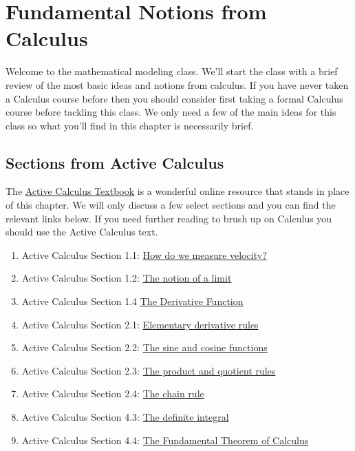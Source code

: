 \chapter{Fundamental Notions from Calculus}
Welcome to the mathematical modeling class.  We'll start the class with a brief review of
the most basic ideas and notions from calculus.  If you have never taken a Calculus course
before then you should consider first taking a formal Calculus course before tackling this
class.  We only need a few of the main ideas for this class so what you'll find in this
chapter is necessarily brief.

\section{Sections from Active Calculus}
The \href{http://faculty.gvsu.edu/boelkinm/Home/AC/index.html}{Active Calculus Textbook}
is a wonderful online resource that stands in place of this chapter.  We will only discuss a
few select sections and you can find the relevant links below.  If you need further
reading to brush up on Calculus you should use the Active Calculus text.  
\begin{enumerate}
    \item Active Calculus Section 1.1: \href{http://faculty.gvsu.edu/boelkinm/Home/AC/sec-1-1-vel.html}{How do we
        measure velocity?}
    \item Active Calculus Section 1.2: \href{http://faculty.gvsu.edu/boelkinm/Home/AC/sec-1-2-lim.html}{The notion of a
        limit}
    \item Active Calculus Section 1.4
        \href{http://faculty.gvsu.edu/boelkinm/Home/AC/sec-1-4-derivative-fxn.html}{The
        Derivative Function}
    \item Active Calculus Section 2.1: 
        \href{http://faculty.gvsu.edu/boelkinm/Home/AC/sec-2-1-elem-rules.html}{Elementary
        derivative rules}
    \item Active Calculus Section 2.2: \href{http://faculty.gvsu.edu/boelkinm/Home/AC/sec-2-2-sin-cos.html}{The sine and cosine functions}
    \item Active Calculus Section 2.3: \href{http://faculty.gvsu.edu/boelkinm/Home/AC/sec-2-3-prod-quot.html}{The
        product and quotient rules}
    \item Active Calculus Section 2.4: \href{http://faculty.gvsu.edu/boelkinm/Home/AC/sec-2-5-chain.html}{The chain
        rule}
    \item Active Calculus Section 4.3: 
        \href{http://faculty.gvsu.edu/boelkinm/Home/AC/sec-4-3-definite-integral.html}{The
        definite integral}
    \item Active Calculus Section 4.4: \href{http://faculty.gvsu.edu/boelkinm/Home/AC/sec-4-4-FTC.html}{The Fundamental Theorem of Calculus}
\end{enumerate}


